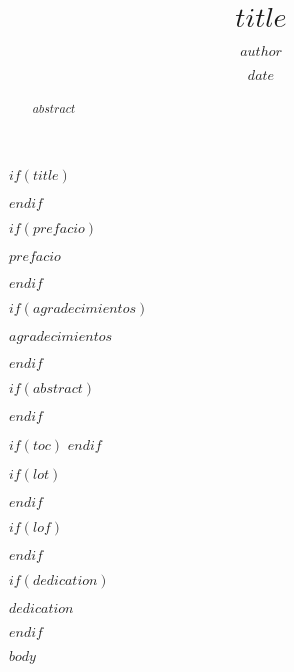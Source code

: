 \documentclass[12pt,twoside]{templates/facsothesis}
\title{$title$}
\author{$author$}
\date{$date$}
\begin{document}
\raggedbottom

$if(title)$
  \maketitle
$endif$

\frontmatter %
 \pagestyle{empty} 

$if(prefacio)$
  \begin{prefacio}
  \thispagestyle{empty}
    $prefacio$
  \end{prefacio}
$endif$

$if(agradecimientos)$
  \begin{agradecimientos}
  \thispagestyle{empty}
  \setlength\parskip{1em plus 0.1em minus 0.2em}
    $agradecimientos$
  \end{agradecimientos}
$endif$

$if(abstract)$
  \begin{abstract}
  \thispagestyle{empty}
  \setlength\parskip{1em plus 0.1em minus 0.2em}
    $abstract$
  \end{abstract}
$endif$

$if(toc)$
  \setcounter{tocdepth}{$toc-depth$}
  \setlength{\parskip}{0pt}
  \tableofcontents
  \thispagestyle{empty}
$endif$

\setlength\parskip{1em plus 0.1em minus 0.2em}

$if(lot)$
  \listoftables
  \thispagestyle{empty}
$endif$

$if(lof)$
  \listoffigures
  \thispagestyle{empty}
$endif$

$if(dedication)$
  \begin{dedication}
    $dedication$
  \end{dedication}
$endif$

\mainmatter %
\titleformat{\chapter}{\normalfont\Huge\bfseries}{\thechapter}{1em}{}
\pagestyle{fancyplain} %

$body$

\end{document}

